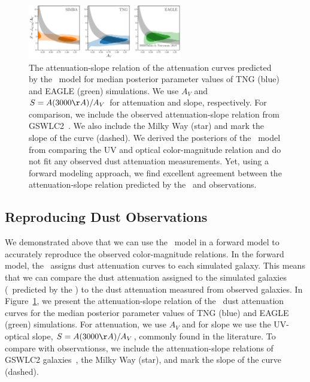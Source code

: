 \begin{figure}
\begin{center}
    \includegraphics[width=0.6\textwidth]{figs/abc_slope_AV_all.pdf}
    \caption{\label{fig:slope}
    The attenuation-slope relation of the attenuation curves predicted by the
    \eda~model for median posterior parameter values of TNG (blue) and EAGLE
    (green) simulations. We use $A_V$ and $S = A(3000\AA)/A_V$ for attenuation
    and slope, respectively. For comparison, we include the observed 
    attenuation-slope relation from GSWLC2~\citep{salim2020}. We also include 
    the Milky Way (star) and mark the slope of the \cite{calzetti2001} curve
    (dashed). We derived the posteriors of the \eda~model from comparing the
    UV and optical color-magnitude relation and do not fit any observed dust
    attenuation measurements. Yet, using a forward modeling approach, we find 
    excellent agreement between the  attenuation-slope relation predicted by
    the \eda~and observations. 
    }
\end{center}
\end{figure}

\subsection{Reproducing Dust Observations} 
We demonstrated above that we can use the \eda~model in a forward model to
accurately reproduce the observed color-magnitude relations. In the forward
model, the \eda~assigns dust attenuation curves to each simulated galaxy. This
means that we can compare the dust attenuation assigned to the simulated
galaxies (\ie~predicted by the \eda) to the dust attenuation measured from 
observed galaxies. In Figure~\ref{fig:slope}, we present the attenuation-slope 
relation of the \eda~dust attenuation curves for the median posterior parameter 
values of TNG (blue) and EAGLE (green) simulations. For attenuation, we use
$A_V$ and for slope we use the UV-optical slope, $S = A(3000\AA)/A_V$, commonly
found in the literature. To compare with observationss, we include the 
attenuation-slope relations of GSWLC2 galaxies~\citep[grey;][]{salim2020}, the
Milky Way (star), and mark the slope of the \cite{calzetti2001} curve (dashed). 

